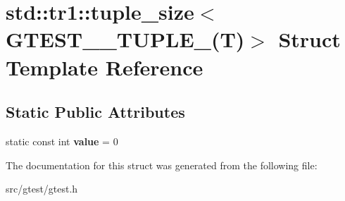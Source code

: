 \hypertarget{structstd_1_1tr1_1_1tuple__size_3_01_g_t_e_s_t__0___t_u_p_l_e___07_t_08_4}{}\section{std\+:\+:tr1\+:\+:tuple\+\_\+size$<$ G\+T\+E\+S\+T\+\_\+\_\+\+T\+U\+P\+L\+E\+\_\+(T)$>$ Struct Template Reference}
\label{structstd_1_1tr1_1_1tuple__size_3_01_g_t_e_s_t__0___t_u_p_l_e___07_t_08_4}
\subsection*{Static Public Attributes}
\begin{DoxyCompactItemize}
\item 
\mbox{\label{structstd_1_1tr1_1_1tuple__size_3_01_g_t_e_s_t__0___t_u_p_l_e___07_t_08_4_a95d9157e7a9e9c49b87f0d8c8ddf25d2}} 
static const int {\bfseries value} = 0
\end{DoxyCompactItemize}


The documentation for this struct was generated from the following file\+:\begin{DoxyCompactItemize}
\item 
src/gtest/gtest.\+h\end{DoxyCompactItemize}
